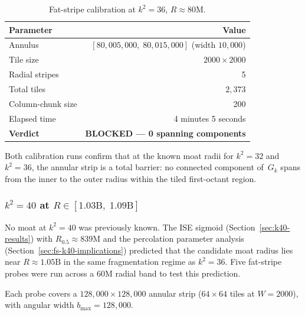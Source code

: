 \documentclass[11pt,a4paper]{article}
\newcommand{\Gk}{G_k}
\newcommand{\Rhalf}{R_{0.5}}
\theoremstyle{definition}
\theoremstyle{plain}
\theoremstyle{remark}
\begin{document}
\begin{table}[ht]
\centering
\begin{tabular}{@{}lr@{}}
\toprule
Parameter & Value \\
\midrule
Annulus                & $[80{,}005{,}000,\; 80{,}015{,}000]$ (width $10{,}000$) \\
Tile size              & $2000 \times 2000$ \\
Radial stripes         & 5 \\
Total tiles            & $2{,}373$ \\
Column-chunk size      & 200 \\
Elapsed time           & 4 minutes 5 seconds \\
\midrule
\textbf{Verdict}       & \textbf{BLOCKED --- 0 spanning components} \\
\bottomrule
\end{tabular}
\caption{Fat-stripe calibration at $k^2 = 36$, $R \approx 80\text{M}$.}
\label{tab:fs-k36}
\end{table}

Both calibration runs confirm that at the known moat radii for $k^2 = 32$ and $k^2 = 36$, the annular strip is a total barrier: no connected component of~$\Gk$ spans from the inner to the outer radius within the tiled first-octant region.

\subsubsection{\texorpdfstring{$k^2 = 40$}{k\texttwosuperior\ = 40} at \texorpdfstring{$R \in [1.03\text{B},\; 1.09\text{B}]$}{R in [1.03B, 1.09B]}}\label{sec:fs-k40}

No moat at $k^2 = 40$ was previously known.  The ISE sigmoid (Section~\ref{sec:k40-results}) with $\Rhalf \approx 839\text{M}$ and the percolation parameter analysis (Section~\ref{sec:fs-k40-implications}) predicted that the candidate moat radius lies near $R \approx 1.05\text{B}$ in the same fragmentation regime as $k^2 = 36$.  Five fat-stripe probes were run across a 60M radial band to test this prediction.

Each probe covers a $128{,}000 \times 128{,}000$ annular strip ($64 \times 64$ tiles at $W = 2000$), with angular width $b_{\max} = 128{,}000$.
\end{document}
